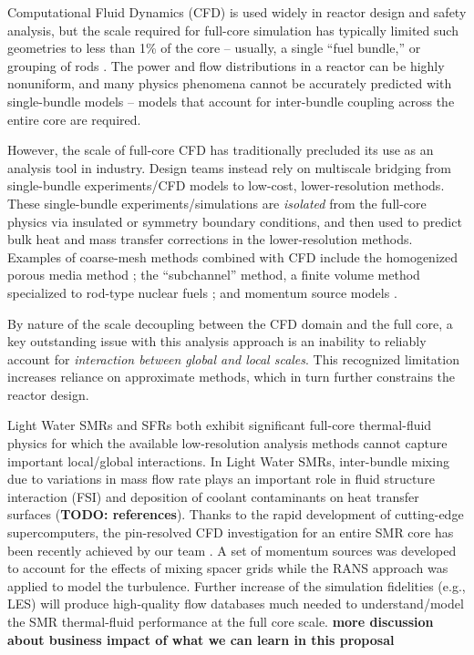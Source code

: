 Computational Fluid Dynamics (CFD) is used widely in reactor design and safety
analysis, but the scale required for full-core simulation has typically limited
such geometries to less than 1\% of the core -- usually, a single ``fuel
bundle,'' or grouping of rods \cite{wang2020,fanning,wang2020b}. The power and
flow distributions in a reactor can be highly nonuniform, and many physics
phenomena cannot be accurately predicted with single-bundle models -- models that
account for inter-bundle coupling across the entire core are required.  

However, the
scale of full-core CFD has traditionally precluded its use as an analysis tool
in industry. Design teams instead rely on multiscale bridging from single-bundle
experiments/CFD models to low-cost, lower-resolution methods.
These single-bundle experiments/simulations are {\it isolated} from
the full-core physics via insulated or symmetry boundary conditions, and then used
to predict bulk heat and mass transfer corrections in the lower-resolution methods.
  Examples of coarse-mesh methods combined with CFD include the
homogenized porous media method \cite{wang2020c,Kim2020}; the ``subchannel'' method, a
finite volume method specialized to rod-type nuclear fuels \cite{blyth}; and
momentum source models \cite{hu2013}. 

By nature of the scale decoupling between the CFD domain and the full core, a
key outstanding issue with this analysis approach is an inability to reliably 
account for {\it interaction between global and local scales}. This recognized
limitation increases reliance on approximate methods, which in turn further
constrains the reactor design.

Light Water SMRs and SFRs both exhibit significant full-core thermal-fluid
physics for which the available low-resolution analysis methods cannot capture
important local/global interactions. In Light Water SMRs, inter-bundle mixing
due to variations in mass flow rate plays an important role in fluid structure
interaction (FSI) and deposition of coolant contaminants on heat transfer
surfaces ({\bf TODO: references}). Thanks to the rapid 
development of cutting-edge supercomputers, the pin-resolved CFD investigation
for an entire SMR core has been recently achieved by our team \cite{Fang2021}. 
A set of momentum sources was developed to account for the effects of mixing 
spacer grids while the RANS approach was applied to model the turbulence. Further
increase of the simulation fidelities (e.g., LES) will produce high-quality flow databases
much needed to understand/model the SMR thermal-fluid performance at the full
core scale.  %
{\bf more discussion about business impact of what we can learn in this proposal}

